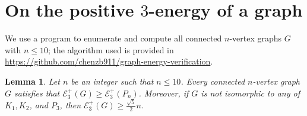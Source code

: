 \documentclass[a4paper,12pt]{article}
\theoremstyle{plain}
\newtheorem{lemma}[thm]{Lemma}
\begin{document}
\section[positive]{On the positive $3$-energy of a graph}

We use a program to enumerate and compute all connected $n$-vertex graphs $G$ with $n \leq 10$; the algorithm used is provided in 
\href{https://github.com/chenzb911/graph-energy-verification}{https://github.com/chenzb911/graph-energy-verification}.

\begin{lemma}\label{lem:PositiveUpToTenVertices}
Let $n$ be an integer such that $n\leq 10$. Every connected $n$-vertex graph $G$ satisfies that $\mathcal{E}_3^+(G)\geq \mathcal{E}_3^+(P_n)$. Moreover, if $G$ is not isomorphic to any of $K_1,K_2$, and $P_3$, then $\mathcal{E}_3^{+}(G)  \geq \frac{\sqrt{5}}{2}n$.
\end{lemma}



\end{document}
